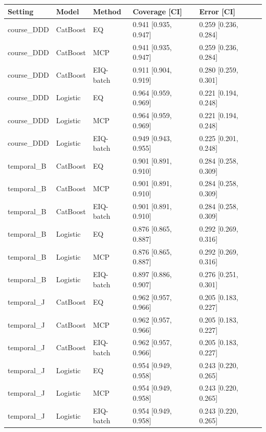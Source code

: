 \begin{tabular}{lllll}
\toprule
Setting & Model & Method & Coverage [CI] & Error [CI]\\
\midrule
course\_DDD & CatBoost & EQ & 0.941 [0.935, 0.947] & 0.259 [0.236, 0.284]\\
course\_DDD & CatBoost & MCP & 0.941 [0.935, 0.947] & 0.259 [0.236, 0.284]\\
course\_DDD & CatBoost & EIQ-batch & 0.911 [0.904, 0.919] & 0.280 [0.259, 0.301]\\
course\_DDD & Logistic & EQ & 0.964 [0.959, 0.969] & 0.221 [0.194, 0.248]\\
course\_DDD & Logistic & MCP & 0.964 [0.959, 0.969] & 0.221 [0.194, 0.248]\\
course\_DDD & Logistic & EIQ-batch & 0.949 [0.943, 0.955] & 0.225 [0.201, 0.248]\\
temporal\_B & CatBoost & EQ & 0.901 [0.891, 0.910] & 0.284 [0.258, 0.309]\\
temporal\_B & CatBoost & MCP & 0.901 [0.891, 0.910] & 0.284 [0.258, 0.309]\\
temporal\_B & CatBoost & EIQ-batch & 0.901 [0.891, 0.910] & 0.284 [0.258, 0.309]\\
temporal\_B & Logistic & EQ & 0.876 [0.865, 0.887] & 0.292 [0.269, 0.316]\\
temporal\_B & Logistic & MCP & 0.876 [0.865, 0.887] & 0.292 [0.269, 0.316]\\
temporal\_B & Logistic & EIQ-batch & 0.897 [0.886, 0.907] & 0.276 [0.251, 0.301]\\
temporal\_J & CatBoost & EQ & 0.962 [0.957, 0.966] & 0.205 [0.183, 0.227]\\
temporal\_J & CatBoost & MCP & 0.962 [0.957, 0.966] & 0.205 [0.183, 0.227]\\
temporal\_J & CatBoost & EIQ-batch & 0.962 [0.957, 0.966] & 0.205 [0.183, 0.227]\\
temporal\_J & Logistic & EQ & 0.954 [0.949, 0.958] & 0.243 [0.220, 0.265]\\
temporal\_J & Logistic & MCP & 0.954 [0.949, 0.958] & 0.243 [0.220, 0.265]\\
temporal\_J & Logistic & EIQ-batch & 0.954 [0.949, 0.958] & 0.243 [0.220, 0.265]\\
\bottomrule
\end{tabular}